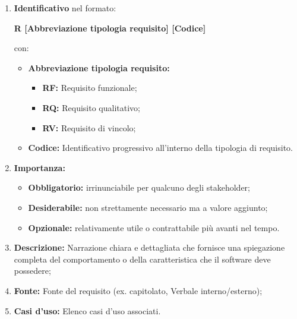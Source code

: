 \documentclass{article}
\begin{document}
\begin{enumerate}
    \item \textbf{Identificativo} nel formato:\\
          \begin{center}
              \textbf{R [Abbreviazione tipologia requisito] [Codice]}
          \end{center}
          con:
          \begin{itemize}
              \item \textbf{Abbreviazione tipologia requisito:}
                    \begin{itemize}
                        \item \textbf{RF:} Requisito funzionale;
                        \item \textbf{RQ:} Requisito qualitativo;
                        \item \textbf{RV:} Requisito di vincolo;
                    \end{itemize}
              \item \textbf{Codice:} Identificativo progressivo all'interno della tipologia di requisito.
          \end{itemize}
    \item \textbf{Importanza:}
          \begin{itemize}
              \item \textbf{Obbligatorio:} irrinunciabile per qualcuno degli stakeholder;
              \item \textbf{Desiderabile:} non strettamente necessario ma a valore aggiunto;
              \item \textbf{Opzionale:} relativamente utile o contrattabile più avanti nel tempo.
          \end{itemize}
    \item \textbf{Descrizione:} Narrazione chiara e dettagliata che fornisce una spiegazione completa del comportamento o della caratteristica che il software deve possedere;
    \item \textbf{Fonte:} Fonte del requisito (ex. capitolato, Verbale interno/esterno);
    \item \textbf{Casi d'uso:} Elenco casi d'uso associati.
\end{enumerate}
\end{document}
